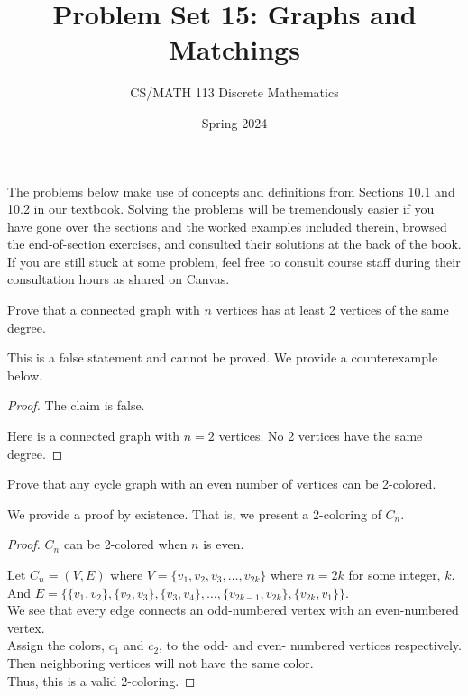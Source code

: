 \documentclass[a4paper]{exam}
\title{Problem Set 15: Graphs and Matchings}
\author{CS/MATH 113 Discrete Mathematics}
\date{Spring 2024}
\begin{document}
\maketitle

The problems below make use of concepts and definitions from Sections 10.1 and 10.2 in our textbook. Solving the problems will be tremendously easier if you have gone over the sections and the worked examples included therein, browsed the end-of-section exercises, and consulted their solutions at the back of the book. If you are still stuck at some problem, feel free to consult course staff during their consultation hours as shared on Canvas.

\begin{questions}
  
  \question Prove that a connected graph with $n$ vertices has at least 2 vertices of the same degree.
    \begin{solution}
      This is a false statement and cannot be proved. We provide a counterexample below.

    \begin{proof} The claim is false.

      Here is a connected graph with $n=2$ vertices. No 2 vertices have the same degree.
    \end{proof}
  \end{solution}

  \question Prove that any cycle graph with an even number of vertices can be 2-colored.
  \begin{solution}
    We provide a proof by existence. That is, we present a 2-coloring of $C_n$.

    \begin{proof} $C_n$ can be 2-colored when $n$ is even.

      Let $C_n=(V,E)$ where $V=\{v_1, v_2, v_3, \ldots, v_{2k}\}$ where $n=2k$ for some integer, $k$.\\
      And $E=\{\{v_1,v_2\}, \{v_2,v_3\}, \{v_3,v_4\}, \ldots, \{v_{2k-1},v_{2k}\}, \{v_{2k},v_1\}\}$.\\
      We see that every edge connects an odd-numbered vertex with an even-numbered vertex.\\
      Assign the colors, $c_1$ and $c_2$, to the odd- and even- numbered vertices respectively.\\
      Then neighboring vertices will not have the same color.\\
      Thus, this is a valid 2-coloring.
    \end{proof}
  \end{solution}


\end{questions}
\end{document}
